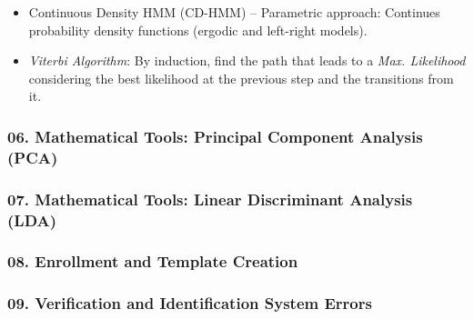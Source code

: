 \documentclass[a4paper]{article}
\begin{document}
\begin{itemize}
        \item Continuous Density HMM (CD-HMM) -- Parametric approach: Continues probability density functions (ergodic and left-right models).

        \item \emph{Viterbi Algorithm}: By induction, find the path that leads to a \emph{Max. Likelihood} considering the best likelihood at the previous step and the transitions from it.
      \end{itemize}
    \subsubsection*{06. Mathematical Tools: Principal Component Analysis (PCA)}
    \subsubsection*{07. Mathematical Tools: Linear Discriminant Analysis (LDA)}
    \subsubsection*{08. Enrollment and Template Creation}
    \subsubsection*{09. Verification and Identification System Errors}
\end{document}
